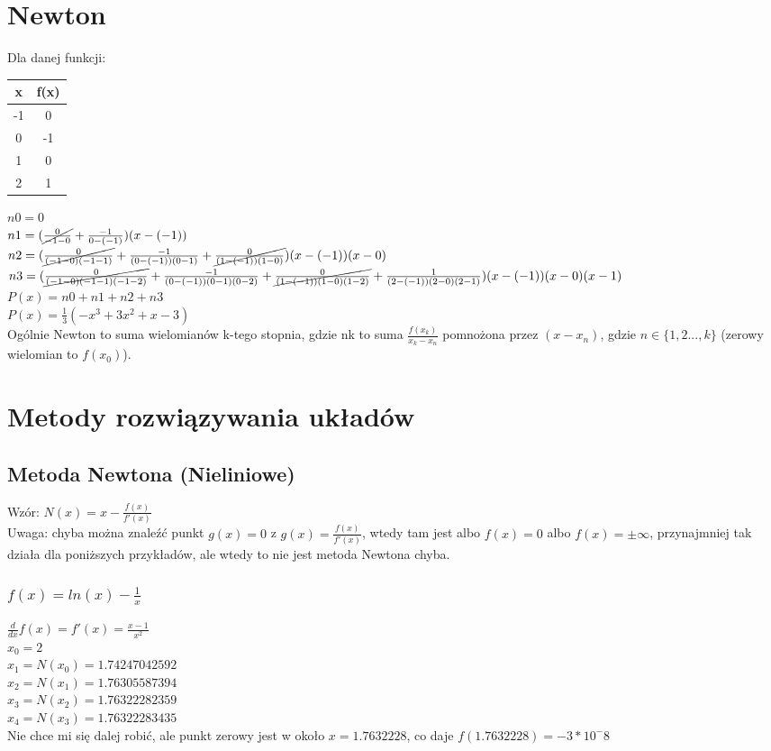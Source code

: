 \documentclass{article}
\begin{document}
\section{Newton}
Dla danej funkcji:
\begin{table}[H]
\begin{tabular}{|c|c|}
\hline
x  & f(x) \\ \hline
-1 & 0    \\ \hline
0  & -1   \\ \hline
1  & 0    \\ \hline
2  & 1    \\ \hline
\end{tabular}%
\end{table}
$n0=0$\\
$n1=(\cancel{\frac{0}{-1-0}} + \frac{-1}{0- (-1)})(x-(-1))$\\
$n2=(\cancel{\frac{0}{(-1-0)(-1-1)}}+\frac{-1}{(0-(-1))(0-1)}+\cancel{\frac{0}{(1-(-1))(1-0)}})(x-(-1))(x-0)$\\
$n3=(\cancel{\frac{0}{(-1-0)(-1-1)(-1-2)}}+\frac{-1}{(0-(-1))(0-1)(0-2)}+\cancel{\frac{0}{(1-(-1))(1-0)(1-2)}}+\frac{1}{(2-(-1))(2-0)(2-1)})(x-(-1))(x-0)(x-1)$\\
$P(x)=n0+n1+n2+n3$\\
$P(x)=\frac{1}{3}(-x^3+3x^2+x-3)$\\
Ogólnie Newton to suma wielomianów k-tego stopnia, gdzie nk to suma $\frac{f(x_k)}{x_k-x_n}$ pomnożona przez $(x-x_n)$, gdzie $n \in \{1,2...,k\}$ (zerowy wielomian to $f(x_0)$).

\section{Metody rozwiązywania układów}
\subsection{Metoda Newtona (Nieliniowe)}
Wzór: $N(x)=x-\frac{f(x)}{f'(x)}$\\
Uwaga: chyba można znaleźć punkt $g(x)=0$ z $g(x)=\frac{f(x)}{f'(x)}$, wtedy tam jest albo $f(x)=0$ albo $f(x)=\pm \infty$, przynajmniej tak działa dla poniższych przykładów, ale wtedy to nie jest metoda Newtona chyba.
\subsubsection{$f(x)=ln(x)-\frac{1}{x}$}
$\frac{d}{dx}f(x)=f'(x)=\frac{x-1}{x^2}$\\
$x_0=2$\\
$x_1=N(x_0)=1.74247042592$\\
$x_2=N(x_1)=1.76305587394$\\
$x_3=N(x_2)=1.76322282359$\\
$x_4=N(x_3)=1.76322283435$\\
Nie chce mi się dalej robić, ale punkt zerowy jest w około $x=1.7632228$, co daje $f(1.7632228)=-3*10^-8$\\
\end{document}
